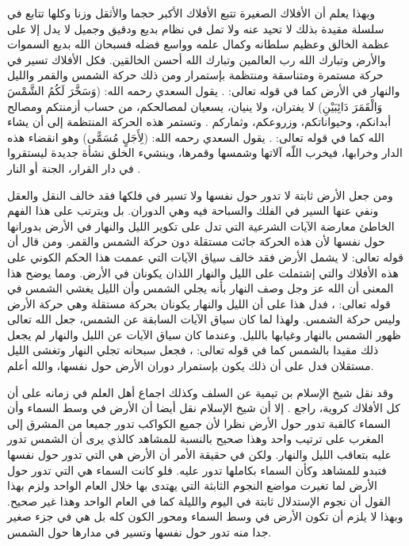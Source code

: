 وبهذا يعلم أن الأفلاك الصغيرة تتبع الأفلاك الأكبر حجما والأثقل وزنا وكلها تتابع في سلسلة مقيدة بذلك لا تحيد عنه ولا تمل في نظام بديع ودقيق وجميل لا يدل إلا على عظمة الخالق وعظيم سلطانه وكمال علمه وواسع فضله فسبحان الله بديع السموات والأرض وتبارك الله رب العالمين وتبارك الله أحسن الخالقين. فكل الأفلاك تسير في حركة مستمرة ومتناسقة ومنتظمة بإستمرار ومن ذلك حركة الشمس والقمر والليل والنهار في الأرض كما في قوله تعالى: \quranayah*[14][33]{\footnotesize (\surahname*[14])}. يقول السعدي رحمه الله: (وَسَخَّرَ لَكُمُ الشَّمْسَ وَالْقَمَرَ دَائِبَيْنِ) لا يفتران، ولا ينيان، يسعيان لمصالحكم، من حساب أزمنتكم ومصالح أبدانكم، وحيواناتكم، وزروعكم، وثماركم \href{https://shamela.ws/book/42/905#p5}{\faExternalLink} \cite{tafsir_Saadi}. وتستمر هذه الحركة المنتظمة إلى أن يشاء الله كما في قوله تعالى: \quranayah*[39][5]{\footnotesize (\surahname*[39])}. \href{https://shamela.ws/book/42/905#p5}{\faExternalLink} \cite{tafsir_Saadi} يقول السعدي رحمه الله: (لِأَجَلٍ مُسَمًّى) وهو انقضاء هذه الدار وخرابها، فيخرب اللّه آلاتها وشمسها وقمرها، وينشيء الخلق نشأة جديدة ليستقروا في دار القرار، الجنة أو النار \href{https://shamela.ws/book/42/1623#p4}{\faExternalLink} \cite{tafsir_Saadi}.

ومن جعل الأرض ثابتة لا تدور حول نفسها ولا تسير في فلكها فقد خالف النقل والعقل ونفي عنها السير  في الفلك والسباحة فيه وهي الدوران. بل ويترتب على هذا الفهم الخاطئ معارضة الآيات الشرعية التي تدل على تكوير الليل والنهار في الأرض بدورانها حول نفسها لأن هذه الحركة جائت مستقلة دون حركة الشمس والقمر. ومن قال أن قوله تعالى: \quranayah*[21][33]{\footnotesize \surahname*[21]}\comment{\quranayah*[36][40]{\footnotesize (\surahname*[36])}} لا يشمل الأرض فقد خالف سياق الآيات التي عممت هذا الحكم الكوني على هذه الأفلاك والتي إشتملت على الليل والنهار اللذان يكونان في الأرض. ومما يوضح هذا المعنى أن الله عز وجل وصف النهار بأنه يجلي الشمس وأن الليل يغشي الشمس في قوله تعالى: \quranayah*[91][1-4]{\footnotesize \surahname*[91]}، فدل هذا على أن الليل والنهار يكونان بحركة مستقلة وهي حركة الأرض وليس حركة الشمس. ولهذا لما كان سياق الآيات السابقة عن الشمس، جعل الله تعالى ظهور الشمس بالنهار وغيابها بالليل. وعندما كان سياق الآيات عن الليل والنهار لم يجعل ذلك مقيدا بالشمس كما في قوله تعالى: \quranayah*[92][1-2]{\footnotesize \surahname*[92]}، فجعل سبحانه تجلي النهار وتغشى الليل مستقلان فدل على أن ذلك يكون بإستمرار دوران الأرض حول نفسها، والله أعلم. 

وقد نقل شيخ الإسلام بن تيمية عن السلف وكذلك اجماع أهل العلم في زمانه على أن كل الأفلاك كروية، راجع . إلا أن شيخ الإسلام نقل أيضا أن الأرض في وسط السماء وأن السماء كالقبة تدور حول الأرض نظرا لأن جميع الكواكب تدور جميعا من المشرق إلى المغرب على ترتيب واحد وهذا صحيح بالنسبة للمشاهد كالذي يرى أن الشمس تدور عليه بتعاقب الليل والنهار. ولكن في حقيقة الأمر أن الأرض هي التي تدور حول نفسها فتبدو للمشاهد وكأن السماء بكاملها تدور عليه. فلو كانت السماء هي التي تدور حول الأرض لما تغيرت مواضع النجوم الثابثة التي يهتدى بها خلال العام الواحد ولزم بهذا القول أن نجوم الإستدلال ثابتة في اليوم والليلة كما في العام الواحد وهذا غير صحيح. وبهذا لا يلزم أن تكون الأرض في وسط السماء ومحور الكون كله بل هي في جزء صغير جدا منه تدور حول نفسها وتسير في مدارها حول الشمس. 


